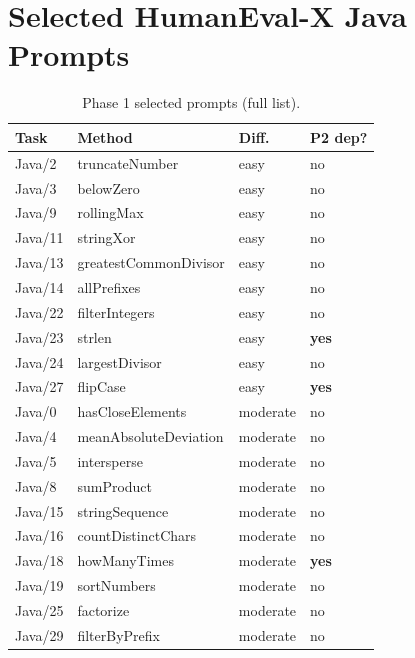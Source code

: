 \documentclass[journal]{IEEEtran}
\begin{document}
\appendices
\section{Selected HumanEval-X Java Prompts}\label{app:prompts}

\begin{table}[!ht]
\renewcommand{\arraystretch}{1.05}
\caption{Phase 1 selected prompts (full list).}
\label{tab:prompts-full}
\centering
\footnotesize
\begin{tabular}{@{}llll@{}}
\toprule
\textbf{Task} & \textbf{Method} & \textbf{Diff.} & \textbf{P2 dep?} \\
\midrule
Java/2  & truncateNumber       & easy  & no \\
Java/3  & belowZero            & easy  & no \\
Java/9  & rollingMax           & easy  & no \\
Java/11 & stringXor            & easy  & no \\
Java/13 & greatestCommonDivisor& easy  & no \\
Java/14 & allPrefixes          & easy  & no \\
Java/22 & filterIntegers       & easy  & no \\
Java/23 & strlen               & easy  & \textbf{yes} \\
Java/24 & largestDivisor       & easy  & no \\
Java/27 & flipCase             & easy  & \textbf{yes} \\
\midrule
Java/0  & hasCloseElements     & moderate & no \\
Java/4  & meanAbsoluteDeviation& moderate & no \\
Java/5  & intersperse          & moderate & no \\
Java/8  & sumProduct           & moderate & no \\
Java/15 & stringSequence       & moderate & no \\
Java/16 & countDistinctChars   & moderate & no \\
Java/18 & howManyTimes         & moderate & \textbf{yes} \\
Java/19 & sortNumbers          & moderate & no \\
Java/25 & factorize            & moderate & no \\
Java/29 & filterByPrefix       & moderate & no \\

\end{tabular}
\end{table}
\end{document}
